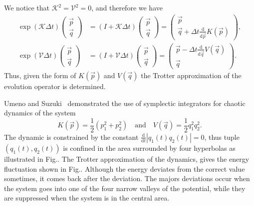 We notice that $\mathcal{K}^2 = \mathcal{V}^2 = 0$, and therefore we have
\begin{align}
\exp \left( \mathcal{K} \Delta t \right) \left( \begin{matrix}
\vec{p} \\ \vec{q}
\end{matrix} \right)
&=
(I+\mathcal{K}\Delta t) \left( \begin{matrix}
\vec{p} \\ \vec{q}
\end{matrix} \right)
=
\left( \begin{matrix}
\vec{p} \\ \vec{q} + \Delta t \frac{\mathrm{d}}{\mathrm{d} \vec{p}} K(\vec{p})
\end{matrix} \right), \\
\exp \left( \mathcal{V} \Delta t \right) \left( \begin{matrix}
\vec{p} \\ \vec{q}
\end{matrix} \right)
&= (I+\mathcal{V}\Delta t) \left( \begin{matrix}
\vec{p} \\ \vec{q}
\end{matrix} \right)
=
\left( \begin{matrix}
\vec{p} - \Delta t \frac{\mathrm{d}}{\mathrm{d} \vec{q}} V(\vec{q}) \\ \vec{q} 
\end{matrix} \right).
\end{align}
Thus, given the form of $K(\vec{p})$ and $V(\vec{q})$ the Trotter approximation of the evolution operator is determined.

Umeno and Suzuki~\citep{US93,SU93} demonstrated the use of symplectic integrators for chaotic dynamics of the system
\begin{equation}
K(\vec{p}) = \frac{1}{2} (p_1^2 + p_2^2) \quad \mathrm{and} \quad V(\vec{q}) = \frac{1}{2} 	q_1^2 q_2^2.
\end{equation}
The dynamic is constrained by the constant $\frac{\mathrm{d}}{\mathrm{d} t} |q_1(t) q_2(t)| = 0$, thus tuple $(q_1(t), q_2(t))$ is confined in the area surrounded by four hyperbolas as illustrated in Fig.. The Trotter approximation of the dynamics, gives  the energy fluctuation shown in Fig.. Although the energy deviates from the correct value sometimes, it comes back after the deviation. The majors deviations occur when the system goes into one of the four narrow valleys of the potential, while they are suppressed when the system is in the central area.

